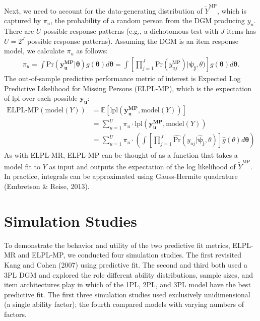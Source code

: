 \documentclass[
  english,
  man,floatsintext]{apa7}
\begin{document}
Next, we need to account for the data-generating distribution of \(\tilde Y^{\text{MP}}\), which is captured by \(\pi_u\), the probability of a random person from the DGM producing \(y_u\). There are \(U\) possible response patterns (e.g., a dichotomous test with \(J\) items has \(U = 2^J\) possible response patterns). Assuming the DGM is an item response model, we calculate \(\pi_u\) as follows:
\begin{align}
\pi_u = \int {\text{Pr}}(\bm{y_u^\text{MP}}|\bm{\theta}) g(\bm{\theta}) d\bm{\theta} = \int \left[\prod_{j=1}^{J} {\text{Pr}}(y_{uj}^\text{MP}) | \bm{\psi_j}, \theta) \right] g(\bm{\theta}) d\bm{\theta}.
\end{align}
The out-of-sample predictive performance metric of interest is Expected Log Predictive Likelihood for Missing Persons (ELPL-MP), which is the expectation of lpl over each possible \(\bm{y_u}\):
\begin{align}
\text{ELPL-MP}(\text{model}(Y)) &= \mathbb{E}\left[\text{lpl}(\bm{y_u^\text{MP}}, \text{model}(Y))\right] \\ &= \sum_{u=1}^{U} \pi_u \cdot \text{lpl}(\bm{y_u^\text{MP}}, \text{model}(Y)) \\ &= \sum_{u=1}^{U} \pi_u \cdot \left( \int \left[\prod_{j=1}^{J} \hat{\text{Pr}}(y_{uj} | \bm{\hat\psi_j}, \theta) \right] \hat g(\theta) d\bm{\theta} \right) \label{eq:elplmp}
\end{align}
As with ELPL-MR, ELPL-MP can be thought of as a function that takes a model fit to \(Y\) as input and outputs the expectation of the log likelihood of \(\tilde Y^{\text{MP}}\). In practice, integrals can be approximated using Gauss-Hermite quadrature (Embretson \& Reise, 2013).

\hypertarget{sim}{%
\section{Simulation Studies}\label{sim}}

To demonstrate the behavior and utility of the two predictive fit metrics, ELPL-MR and ELPL-MP, we conducted four simulation studies. The first revisited Kang and Cohen (2007) using predictive fit. The second and third both used a 3PL DGM and explored the role different ability distributions, sample sizes, and item architectures play in which of the 1PL, 2PL, and 3PL model have the best predictive fit. The first three simulation studies used exclusively unidimensional (a single ability factor); the fourth compared models with varying numbers of factors.
\end{document}
